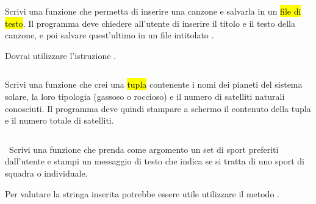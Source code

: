 \documentclass[a4paper,11pt,addpoints]{exam}
\begin{document}
\begin{questions}
    \begin{solution}
        \small\inputminted{python}{solution/022.py}
    \end{solution}

    \questionspace

    \question[2]  Scrivi una funzione che permetta di inserire una canzone e salvarla in un \hl{file di testo}.
    Il programma deve chiedere all'utente di inserire il titolo e il testo della canzone, e poi salvare
    quest'ultimo in un file intitolato .

    \begin{tips}
        \item Dovrai utilizzare l'istruzione .
    \end{tips}

    \begin{solution}
        \small\inputminted{python}{solution/023.py}
    \end{solution}

    \questionspace

    \question[2]  Scrivi una funzione che crei una \hl{tupla} contenente i nomi dei pianeti del sistema solare,
    la loro tipologia (gassoso o roccioso) e il numero di satelliti naturali conosciuti.
    Il programma deve quindi stampare a schermo il contenuto della tupla e il numero totale di satelliti.

    \begin{solution}
        \small\inputminted{python}{solution/024.py}
    \end{solution}

    \questionspace

    \question[3]  Scrivi una funzione che prenda come argomento un set di sport preferiti dall'utente e
    stampi un messaggio di testo che indica se si tratta di uno sport di squadra o individuale.

    \begin{tips}
        \item Per valutare la stringa inserita potrebbe essere utile utilizzare il metodo .
    \end{tips}

    \begin{solution}
        \small\inputminted{python}{solution/025.py}
    \end{solution}

    \addpointtable
\end{questions}
\end{document}

